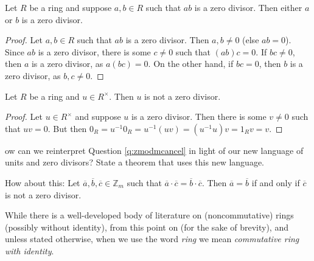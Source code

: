 \documentclass[english,course]{lecture}
\theoremstyle{plain}
\newenvironment{question}[1]
  {\renewcommand\theinnerquestion{#1}\innerquestion}
  {\endinnerquestion}
\def\Z{{\mathbb Z}}
\def\presnotes{}
\begin{document}
\begin{theorem}
	Let $R$ be a ring and suppose $a,b\in R$ such that $ab$ is a zero divisor.
	Then either $a$ or $b$ is a zero divisor.
\end{theorem}

\begin{proof}
	Let $a,b\in R$ such that $ab$ is a zero divisor.
	Then $a,b\ne 0$ (else $ab = 0$).
	Since $ab$ is a zero divisor, there is some $c\ne 0$ such that $(ab) c = 0$.
	If $bc\ne 0$, then $a$ is a zero divisor, as $a(bc) = 0$.
	On the other hand, if $bc=0$, then $b$ is a zero divisor, as $b,c\ne 0$.
\end{proof}

\presnotes



\begin{theorem}\label{theorem:unitnotazd}
	Let $R$ be a ring and $u\in R^\times$.
	Then $u$ is not a zero divisor.
\end{theorem}

\begin{proof}
	Let $u\in R^\times$ and suppose $u$ is a zero divisor.
	Then there is some $v\ne 0$ such that $uv = 0$.
	But then $0_R = u^{-1} 0_R = u^{-1} (uv) = (u^{-1} u) v = 1_R v = v$. \Lightning
\end{proof}

\presnotes

\begin{question}
	How can we reinterpret Question \ref{q:zmodmcancel} in light of our new language of units and zero divisors?
	State a theorem that uses this new language.
\end{question}



\begin{answer}
	How about this: Let $\overline{a},\overline{b},\overline{c}\in \Z_m$ such that $\overline{a}\cdot  \overline{c} = \overline{b}\cdot \overline{c}$.
	Then $\overline{a} = \overline{b}$ if and only if $\overline{c}$ is not a zero divisor.
\end{answer}

\presnotes





While there is a well-developed body of literature on (noncommutative) rings (possibly without identity), from this point on (for the sake of brevity), and unless stated otherwise, when we use the word \emph{ring} we mean \emph{commutative ring with identity}.
\end{document}
